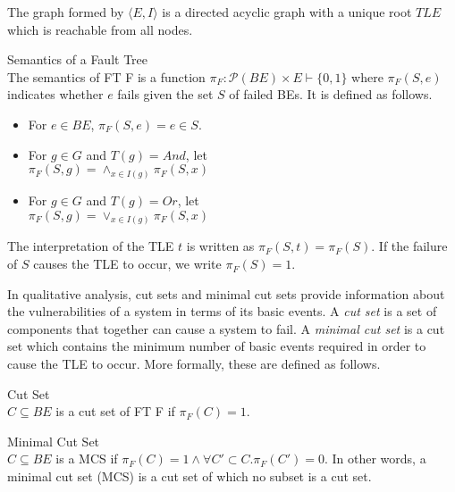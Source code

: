 The graph formed by $\langle E, I \rangle$ is a directed acyclic graph with a unique root $TLE$ which is reachable from all nodes. \\

\begin{definition}Semantics of a Fault Tree\\  
The semantics of FT F is a function $\pi_F : \mathcal{P}(BE) \times E \vdash \{0,1\}$ where $\pi_F(S, e)$ indicates whether $e$ fails given the set $S$ of failed BEs. It is defined as follows. 
\begin{itemize}
\item For $e \in BE$, $\pi_F(S,e) = e \in S$.
\item For $g \in G$ and $T(g) = And$, let\\ $\pi_F(S,g) = \land_{x \in I(g)} \pi_F(S, x)$
\item For $g \in G$ and $T(g) = Or$, let\\ $\pi_F(S,g) = \lor_{x \in I(g)} \pi_F(S, x)$ \\
\end{itemize}
\end{definition}

The interpretation of the TLE $t$ is written as $\pi_F(S,t) = \pi_F(S)$. If the failure of $S$ causes the TLE to occur, we write $\pi_F(S) = 1$. 

 In qualitative analysis, cut sets and minimal cut sets provide information about the vulnerabilities of a system in terms of its basic events. A \textit{cut set} is a set of components that together can cause a system to fail. A \textit{minimal cut set} is a cut set which contains the minimum number of basic events required in order to cause the TLE to occur. More formally, these are defined as follows. \\

\begin{definition}Cut Set\\   
 $C \subseteq BE$ is a cut set of FT F if $\pi_F(C) = 1$. \\
\end{definition}

\begin{definition}Minimal Cut Set\\    
$C \subseteq BE$ is a MCS if $\pi_F(C) = 1 \land \forall C' \subset C. \pi_F(C') = 0$. In other words, a minimal cut set (MCS) is a cut set of which no subset is a cut set. \\
\end{definition}

